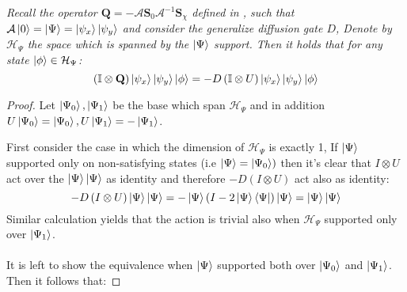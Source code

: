 \documentclass{article}
\begin{document}
\begin{claim} \textit{ Recall the operator $\mathbf Q  = - {\mathcal A}  {\mathbf S}_0 
  {\mathcal A}^{-1}  {\mathbf S}_\chi$ defined in \cite{Brassard_2002}, such that $ \mathcal A \ket{0} = \ket{\Psi} = \ket{\psi_{x}}\ket{\psi_{y}}$ and 
consider the generalize diffusion gate $D$, Denote by $\mathcal{H}_{\Psi}$ the space which is spanned by the $\ket{\Psi}$ support. Then it holds that for any state $ \ket{\phi} \in \mathcal{H}_{\Psi} $:}
\begin{equation*}
  \left(  \mathbb{I} \otimes \mathbf Q \right) \ket{\psi_{x}}\ket{\psi_{y}} \ket{\phi} =  - D \left( \mathbb{I} \otimes U \right)  \ket{\psi_{x}}\ket{\psi_{y}} \ket{\phi} 
\end{equation*}
\end{claim}
\begin{proof} Let $\ket{\Psi_0}, \ket{\Psi_1}$ be the base which span $ \mathcal{H}_{\Psi}$ and in addition $U\ket{\Psi_0} = \ket{\Psi_0}, U\ket{\Psi_1} =- \ket{\Psi_1}$.

First consider the case in which the dimension of $ \mathcal{H}_{\Psi}$ is exactly 1, If $ \ket{\Psi} $ supported only on non-satisfying states (i.e $\ket{\Psi} = \ket{\Psi_{0}}) $ then it's clear that $ I \otimes U $ act over the $ \ket{\Psi}\ket{\Psi} $ as identity and therefore $ -D\left( I \otimes U \right) $ act also as identity: 
\begin{equation*}
  -D\left( I \otimes U \right) \ket{\Psi}\ket{\Psi} = -\ket{\Psi}\left( I - 2\ket{\Psi}\bra{\Psi}  \right) \ket{\Psi} = \ket{\Psi}\ket{\Psi}
\end{equation*}
Similar calculation yields that the action is trivial also when  $ \mathcal{H}_{\Psi}$  supported only over $ \ket{\Psi_1} $.  

\paragraph{}

It is left to show the equivalence when $\ket{\Psi}$ supported both over $\ket{\Psi_0}$ and $\ket{\Psi_1}$. Then it follows that:


\end{proof}
\end{document}
